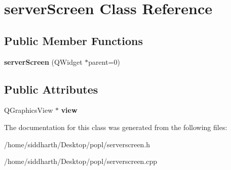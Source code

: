 \hypertarget{classserver_screen}{}\section{server\+Screen Class Reference}
\label{classserver_screen}
\subsection*{Public Member Functions}
\begin{DoxyCompactItemize}
\item 
{\bfseries server\+Screen} (Q\+Widget $\ast$parent=0)\hypertarget{classserver_screen_aed60f38148ef6543c04cc09597058b1f}{}\label{classserver_screen_aed60f38148ef6543c04cc09597058b1f}

\end{DoxyCompactItemize}
\subsection*{Public Attributes}
\begin{DoxyCompactItemize}
\item 
Q\+Graphics\+View $\ast$ {\bfseries view}\hypertarget{classserver_screen_aa72c08ad09961cef83151e960ec60f93}{}\label{classserver_screen_aa72c08ad09961cef83151e960ec60f93}

\end{DoxyCompactItemize}


The documentation for this class was generated from the following files\+:\begin{DoxyCompactItemize}
\item 
/home/siddharth/\+Desktop/popl/serverscreen.\+h\item 
/home/siddharth/\+Desktop/popl/serverscreen.\+cpp\end{DoxyCompactItemize}
